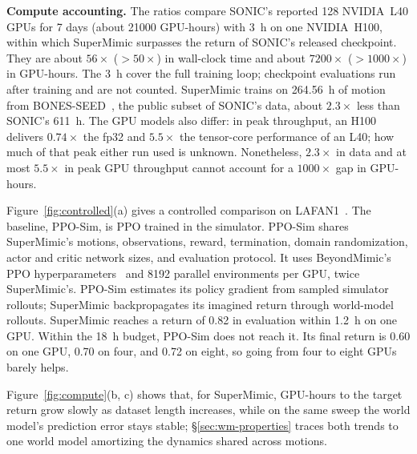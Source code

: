 \label{par:accounting}\noindent\textbf{Compute accounting.} The ratios compare SONIC's reported 128 NVIDIA~L40 GPUs for 7 days (about \num{21000} GPU-hours) with \qty{3}{\hour} on one NVIDIA~H100, within which SuperMimic surpasses the return of SONIC's released checkpoint. They are about $56\times$ ($>50\times$) in wall-clock time and about $7200\times$ ($>1000\times$) in GPU-hours. The \qty{3}{\hour} cover the full training loop; checkpoint evaluations run after training and are not counted. SuperMimic trains on \qty{264.56}{\hour} of motion from BONES-SEED~\citep{bones2026seed}, the public subset of SONIC's data, about $2.3\times$ less than SONIC's \qty{611}{\hour}. The GPU models also differ: in peak throughput, an H100 delivers $0.74\times$ the fp32 and $5.5\times$ the tensor-core performance of an L40; how much of that peak either run used is unknown. Nonetheless, $2.3\times$ in data and at most $5.5\times$ in peak GPU throughput cannot account for a $1000\times$ gap in GPU-hours.

Figure~\ref{fig:controlled}(a) gives a controlled comparison on LAFAN1~\citep{harvey2020robust}. The baseline, PPO-Sim, is PPO trained in the simulator. PPO-Sim shares SuperMimic's motions, observations, reward, termination, domain randomization, actor and critic network sizes, and evaluation protocol. It uses BeyondMimic's PPO hyperparameters~\citep{liao2025beyondmimic} and 8192 parallel environments per GPU, twice SuperMimic's. PPO-Sim estimates its policy gradient from sampled simulator rollouts; SuperMimic backpropagates its imagined return through world-model rollouts. SuperMimic reaches a return of 0.82 in evaluation within \qty{1.2}{\hour} on one GPU. Within the \qty{18}{\hour} budget, PPO-Sim does not reach it. Its final return is 0.60 on one GPU, 0.70 on four, and 0.72 on eight, so going from four to eight GPUs barely helps.

Figure~\ref{fig:compute}(b, c) shows that, for SuperMimic, GPU-hours to the target return grow slowly as dataset length increases, while on the same sweep the world model's prediction error stays stable; \S\ref{sec:wm-properties} traces both trends to one world model amortizing the dynamics shared across motions.

